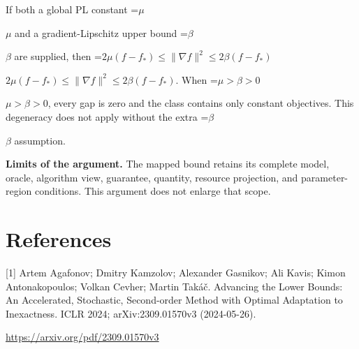 \documentclass[10pt,a4paper]{article}
\newcommand{\AtlasMath}[1]{\par\begingroup\centering\setbox0=\hbox{$\displaystyle #1$}\ifdim\wd0>1.4\linewidth\typeout{ATLAS WIDE FORMULA: \the\wd0}\fi\ifdim\wd0>\linewidth\resizebox{\linewidth}{!}{\box0}\else\box0\fi\par\endgroup}
\newcommand{\AtlasInlineMath}[1]{\begingroup\setbox0=\hbox{$#1$}\ifdim\wd0>.4\linewidth\endgroup\AtlasMath{#1}\else\endgroup$#1$\fi}
\begin{document}
If both a global PL constant \AtlasInlineMath{\mu} and a gradient-Lipschitz upper bound \AtlasInlineMath{\beta} are supplied, then \AtlasInlineMath{2\mu(f-f_*)\le\|\nabla f\|^2\le2\beta(f-f_*)}. When \AtlasInlineMath{\mu>\beta>0}, every gap is zero and the class contains only constant objectives. This degeneracy does not apply without the extra \AtlasInlineMath{\beta} assumption.

\textbf{Limits of the argument.} The mapped bound retains its complete model, oracle, algorithm view, guarantee, quantity, resource projection, and parameter-region conditions. This argument does not enlarge that scope.

\section{References}
[1] Artem Agafonov; Dmitry Kamzolov; Alexander Gasnikov; Ali Kavis; Kimon Antonakopoulos; Volkan Cevher; Martin Takáč. Advancing the Lower Bounds: An Accelerated, Stochastic, Second-order Method with Optimal Adaptation to Inexactness. ICLR 2024; arXiv:2309.01570v3 (2024-05-26).

\url{https://arxiv.org/pdf/2309.01570v3}
\end{document}
